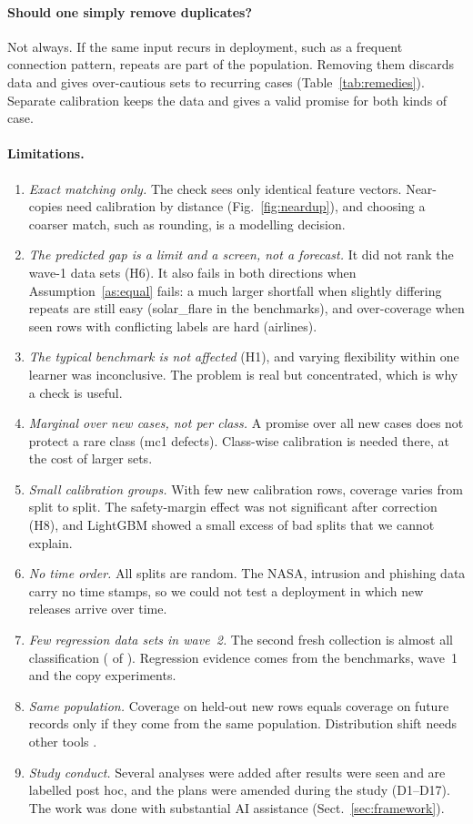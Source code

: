 \paragraph{Should one simply remove duplicates?} Not always. If the same input recurs in deployment, such as a frequent connection pattern, repeats are part of the population. Removing them discards data and gives over-cautious sets to recurring cases (Table~\ref{tab:remedies}). Separate calibration keeps the data and gives a valid promise for both kinds of case.

\paragraph{Limitations.}
\begin{enumerate}
\item \emph{Exact matching only.} The check sees only identical feature vectors. Near-copies need calibration by distance (Fig.~\ref{fig:neardup}), and choosing a coarser match, such as rounding, is a modelling decision.
\item \emph{The predicted gap is a limit and a screen, not a forecast.} It did not rank the wave-1 data sets (H6). It also fails in both directions when Assumption~\ref{as:equal} fails: a much larger shortfall when slightly differing repeats are still easy (solar\_flare in the benchmarks), and over-coverage when seen rows with conflicting labels are hard (airlines).
\item \emph{The typical benchmark is not affected} (H1), and varying flexibility within one learner was inconclusive. The problem is real but concentrated, which is why a check is useful.
\item \emph{Marginal over new cases, not per class.} A promise over all new cases does not protect a rare class (mc1 defects). Class-wise calibration is needed there, at the cost of larger sets.
\item \emph{Small calibration groups.} With few new calibration rows, coverage varies from split to split. The safety-margin effect was not significant after correction (H8), and LightGBM showed a small excess of bad splits that we cannot explain.
\item \emph{No time order.} All splits are random. The NASA, intrusion and phishing data carry no time stamps, so we could not test a deployment in which new releases arrive over time.
\item \emph{Few regression data sets in wave~2.} The second fresh collection is almost all classification (\NWTwoNCls{} of \NWTwoN{}). Regression evidence comes from the benchmarks, wave~1 and the copy experiments.
\item \emph{Same population.} Coverage on held-out new rows equals coverage on future records only if they come from the same population. Distribution shift needs other tools \citep{tibshirani2019,barber2023}.
\item \emph{Study conduct.} Several analyses were added after results were seen and are labelled post hoc, and the plans were amended during the study (D1--D17). The work was done with substantial AI assistance (Sect.~\ref{sec:framework}).
\end{enumerate}

